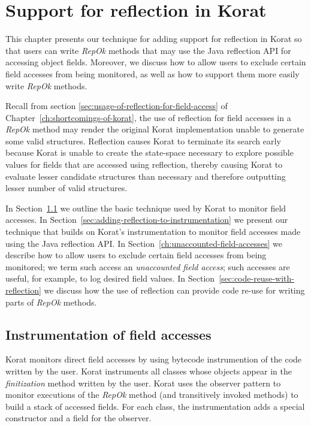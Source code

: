 \chapter{Support for reflection in Korat}
\label{ch:adding-reflection}
This chapter presents our technique for adding support for reflection
in Korat so that users can write \emph{RepOk} methods that may use the Java
reflection API for accessing object fields.  Moreover, we discuss how
to allow users to exclude certain field accesses from being monitored,
as well as how to support them more easily write \emph{RepOk} methods.

Recall from section \ref{sec:usage-of-reflection-for-field-access} of
Chapter~\ref{ch:shortcomings-of-korat}, the use of reflection for
field accesses in a \emph{RepOk} method may render the original Korat
implementation unable to generate some valid structures.  Reflection
causes Korat to terminate its search early because Korat is unable to
create the state-space necessary to explore possible values for fields
that are accessed using reflection, thereby causing Korat to evaluate
lesser candidate structures than necessary and therefore outputting
lesser number of valid structures.

\para In Section~\ref{sec:instrumentation-of-field-accesses} we
outline the basic technique used by Korat to monitor field accesses.
In Section~\ref{sec:adding-reflection-to-instrumentation} we present
our technique that builds on Korat's instrumentation to monitor field
accesses made using the Java reflection API. In
Section~\ref{ch:unaccounted-field-accesses} we describe how to allow
users to exclude certain field accesses from being monitored; we term
such access an \emph{unaccounted field access}; such accesses are
useful, for example, to log desired field values.  In
Section~\ref{sec:code-reuse-with-reflection} we discuss how the use of
reflection can provide code re-use for writing parts of \emph{RepOk} methods.

\section{Instrumentation of field accesses}
\label{sec:instrumentation-of-field-accesses}
Korat monitors direct field accesses by using bytecode instrumention
of the code written by the user.  Korat instruments all classes whose
objects appear in the \emph{finitization} method written by the
user. Korat uses the observer pattern \cite{gamma1994design} to
monitor executions of the \emph{RepOk} method (and transitively
invoked methods) to build a stack of accessed fields. For each class,
the instrumentation adds a special constructor and a field for the
observer.

